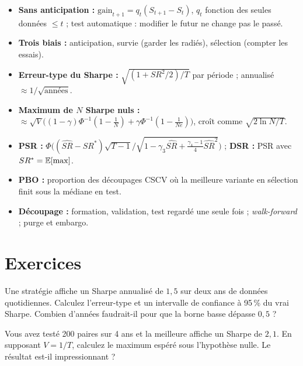 \begin{whiteboard}
\begin{itemize}[leftmargin=1.2em]
\item \textbf{Sans anticipation :} $\text{gain}_{t+1} = q_t(S_{t+1}-S_t)$, $q_t$ fonction des seules données $\le t$ ; test automatique : modifier le futur ne change pas le passé.
\item \textbf{Trois biais :} anticipation, survie (garder les radiés), sélection (compter les essais).
\item \textbf{Erreur-type du Sharpe :} $\sqrt{(1+SR^2/2)/T}$ par période ; annualisé $\approx 1/\sqrt{\text{années}}$.
\item \textbf{Maximum de $N$ Sharpe nuls :} $\approx\sqrt V\big((1-\gamma)\Phi^{-1}(1-\tfrac1N) + \gamma\Phi^{-1}(1-\tfrac{1}{Ne})\big)$, croît comme $\sqrt{2\ln N/T}$.
\item \textbf{PSR :} $\Phi\big((\widehat{SR}-SR^\ast)\sqrt{T-1}/\sqrt{1-\gamma_3\widehat{SR}+\frac{\gamma_4-1}{4}\widehat{SR}^2}\big)$ ; \textbf{DSR :} PSR avec $SR^\ast = \mathbb{E}[\max]$.
\item \textbf{PBO :} proportion des découpages CSCV où la meilleure variante en sélection finit sous la médiane en test.
\item \textbf{Découpage :} formation, validation, test regardé une seule fois ; \emph{walk-forward} ; purge et embargo.
\end{itemize}
\end{whiteboard}

\section{Exercices}

\begin{exercise}
Une stratégie affiche un Sharpe annualisé de $1{,}5$ sur deux ans de données quotidiennes. Calculez l'erreur-type et un intervalle de confiance à 95\,\% du vrai Sharpe. Combien d'années faudrait-il pour que la borne basse dépasse $0{,}5$ ?
\end{exercise}

\begin{exercise}
Vous avez testé 200 paires sur 4 ans et la meilleure affiche un Sharpe de $2{,}1$. En supposant $V = 1/T$, calculez le maximum espéré sous l'hypothèse nulle. Le résultat est-il impressionnant ?
\end{exercise}


